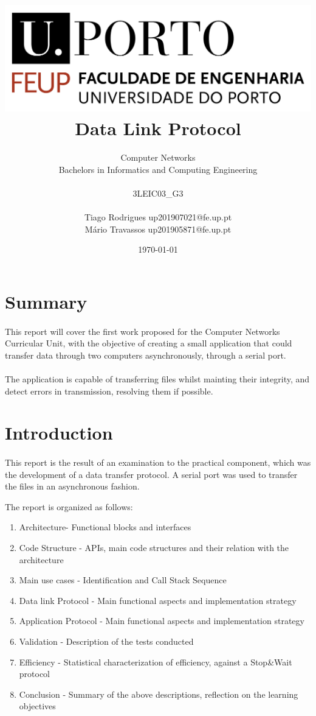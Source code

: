 \documentclass[11pt]{article}
\title{\includegraphics[scale=0.3]{logo.png} \\ \textbf{Data Link Protocol}}
\author{Computer Networks\\ Bachelors in Informatics and Computing Engineering \\ \\ 3LEIC03\_G3 \\ \\ Tiago Rodrigues up201907021@fe.up.pt \\ Mário Travassos up201905871@fe.up.pt  }
\date{\today}
\begin{document}
\maketitle

\newpage

\section*{Summary}

\paragraph{}This report will cover the first work proposed for the Computer Networks Curricular Unit, with the objective of creating a small application that could transfer data through two computers asynchronously, through a serial port.

\paragraph{}The application is capable of transferring files whilst mainting their integrity, and detect errors in transmission, resolving them if possible.

\section*{Introduction}

\paragraph{}This report is the result of an examination to the practical component, which was the development of a data transfer protocol. A serial port was used to transfer the files in an asynchronous fashion.

The report is organized as follows:

\begin{enumerate}
  \item{Architecture- Functional blocks and interfaces}
  \item{Code Structure - APIs, main code structures and their relation with the architecture}
  \item{Main use cases - Identification and Call Stack Sequence}
  \item{Data link Protocol - Main functional aspects and implementation strategy}
  \item{Application Protocol - Main functional aspects and implementation strategy }
  \item{Validation - Description of the tests conducted}
  \item{Efficiency - Statistical characterization of efficiency, against a Stop\&Wait protocol}
  \item{Conclusion - Summary of the above descriptions, reflection on the learning objectives}
\end{enumerate}
\end{document}
